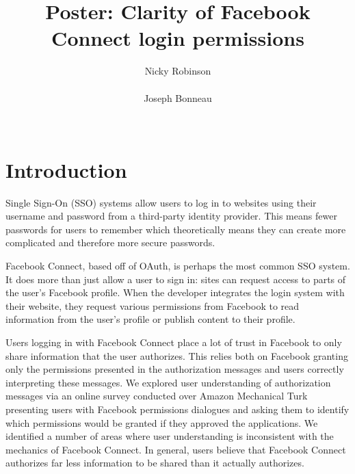 \documentclass[twoside,letterpaper]{soups-poster}
\begin{document}
%

\title{Poster: Clarity of Facebook Connect login permissions}

\author{
\alignauthor
Nicky Robinson\\
       \\
\alignauthor
Joseph Bonneau\\
       \\
}

\maketitle


\section{Introduction}
Single Sign-On (SSO) systems allow users to log in to websites using their username and password from a third-party identity provider.
This means fewer passwords for users to remember which theoretically means they can create more complicated and therefore more secure passwords.

Facebook Connect, based off of OAuth, is perhaps the most common SSO system.
It does more than just allow a user to sign in: sites can request access to parts of the user's Facebook profile.
When the developer integrates the login system with their website, they request various permissions from Facebook to read information from the user's profile or publish content to their profile. %

Users logging in with Facebook Connect place a lot of trust in Facebook to only share information that the user authorizes.
This relies both on Facebook granting only the permissions presented in the authorization messages and users correctly interpreting these messages.
We explored user understanding of authorization messages via an online survey conducted over Amazon Mechanical Turk presenting users with Facebook permissions dialogues and asking them to identify which permissions would be granted if they approved the applications.
We identified a number of areas where user understanding is inconsistent with the mechanics of Facebook Connect.
In general, users believe that Facebook Connect authorizes far less information to be shared than it actually authorizes.
\end{document}
